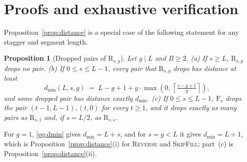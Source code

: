 \documentclass{article}
\newtheorem{proposition}{Proposition}
\theoremstyle{definition}
\theoremstyle{remark}
\newcommand{\name}[1]{\textup{\textsc{#1}}}
\newcommand{\sfill}{\name{SkipFill}\xspace}
\newcommand{\rev}{\name{Reverse}\xspace}
\newcommand{\Rsg}[2]{\mathrm{R}_{#1,#2}}
\newcommand{\Fs}[1]{\mathrm{F}_{#1}}
\newcommand{\dmin}{d_{\min}}
\newcommand{\pos}[1]{\max\!\left(0,\,#1\right)}
\begin{document}



\appendix

\section{Proofs and exhaustive verification}
\label{app:proofs}

Proposition~\ref{prop:distance} is a special case of the following statement for any stagger and segment length.

\begin{proposition}[Dropped pairs of $\Rsg{s}{g}$]
\label{prop:general}
Let $g\mid L$ and $B\ge2$.
(a) If $s\ge L$, $\Rsg{s}{g}$ drops no pair.
(b) If $0\le s\le L-1$, every pair that $\Rsg{s}{g}$ drops has distance at least
\begin{equation}
  \dmin(L,s,g) \;=\; L-g+1+g\cdot\pos{\left\lceil \tfrac{s-g+1}{g}\right\rceil},
  \label{eq:dmin}
\end{equation}
and some dropped pair has distance exactly $\dmin$.
(c) If $0\le s\le L-1$, $\Fs{s}$ drops the pair $(t-1,L-1),(t,0)$ for every $t\ge1$, and it drops exactly as many pairs as $\Rsg{s}{1}$ and, if $s=L/2$, as $\Rsg{s}{s}$.
\end{proposition}

For $g=1$, \eqref{eq:dmin} gives $\dmin=L+s$, and for $s=g<L$ it gives $\dmin=L+1$, which is Proposition~\ref{prop:distance}(i) for \rev and \sfill; part~(c) is Proposition~\ref{prop:distance}(ii).
\end{document}
